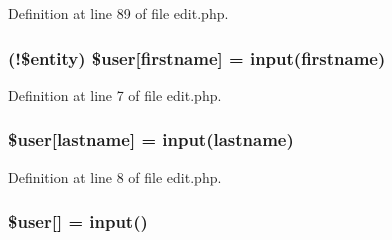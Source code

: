 Definition at line 89 of file edit.\+php.

\subsubsection[{\texorpdfstring{\$user}{$user}}]{ (!\$entity) \${\bf user}\mbox{[}\textquotesingle{}firstname\textquotesingle{}\mbox{]} = {\bf input}(\textquotesingle{}firstname\textquotesingle{})}\hypertarget{components_2_ossn_profile_2actions_2edit_8php_aac0a0d9be0cd7bff33c25dc23bc48f69}{}\label{components_2_ossn_profile_2actions_2edit_8php_aac0a0d9be0cd7bff33c25dc23bc48f69}


Definition at line 7 of file edit.\+php.

\subsubsection[{\texorpdfstring{\$user}{$user}}]{\setlength{\rightskip}{0pt plus 5cm}\${\bf user}\mbox{[}\textquotesingle{}lastname\textquotesingle{}\mbox{]} = {\bf input}(\textquotesingle{}lastname\textquotesingle{})}\hypertarget{components_2_ossn_profile_2actions_2edit_8php_a1187774c6d9942181216e0839e5e73bc}{}\label{components_2_ossn_profile_2actions_2edit_8php_a1187774c6d9942181216e0839e5e73bc}


Definition at line 8 of file edit.\+php.

\subsubsection[{\texorpdfstring{\$user}{$user}}]{\setlength{\rightskip}{0pt plus 5cm}\${\bf user}\mbox{[}\textquotesingle{}\mbox{]} = {\bf input}(\textquotesingle{})}\hypertarget{components_2_ossn_profile_2actions_2edit_8php_ae9de5cc5ae3fec81bb110d3a77ad7eec}{}\label{components_2_ossn_profile_2actions_2edit_8php_ae9de5cc5ae3fec81bb110d3a77ad7eec}


